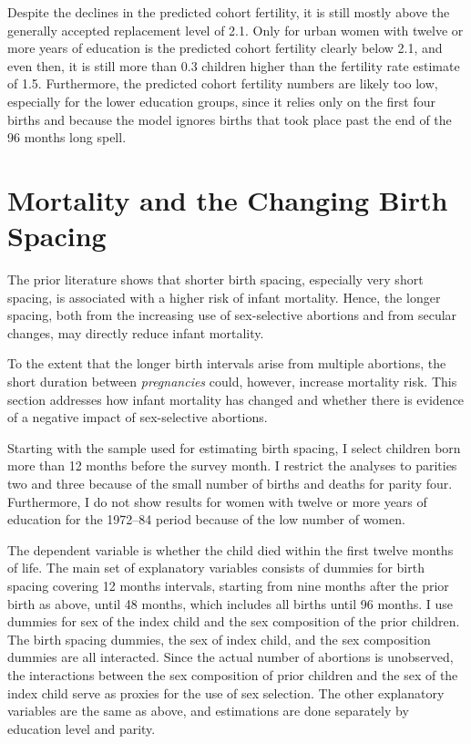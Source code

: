\documentclass[12pt,letterpaper]{article}
\begin{document}
%

Despite the declines in the predicted cohort fertility, it is still mostly above the 
generally accepted replacement level of 2.1.
Only for urban women with twelve or more years of education is the predicted cohort
fertility clearly below 2.1, and even then, it is still more than 0.3 children higher than 
the fertility rate estimate of 1.5.
Furthermore, the predicted cohort fertility numbers are likely too low,
especially for the lower education groups, since it relies only on the
first four births and because the model ignores births that took place past the end
of the 96 months long spell.


\section{Mortality and the Changing Birth Spacing\label{sec:mortality}}

The prior literature shows that shorter birth spacing, especially very short spacing,
is associated with a higher risk of infant mortality.
Hence, the longer spacing, both from the increasing use of sex-selective abortions and
from secular changes, may directly reduce infant mortality.

To the extent that the longer birth intervals arise from multiple abortions,
the short duration between \emph{pregnancies} could, however, increase mortality risk.
This section addresses how infant mortality has changed and whether there is evidence
of a negative impact of sex-selective abortions.

Starting with the sample used for estimating birth spacing, I select children born 
more than 12 months before the survey month.
I restrict the analyses to parities two and three because of the small number
of births and deaths for parity four.
Furthermore, I do not show results for women with twelve or more years of
education for the 1972--84 period because of the low number of women.

The dependent variable is whether the child died within the first twelve
months of life.
The main set of explanatory variables consists of dummies for birth spacing
covering 12 months intervals, starting from nine months after the prior birth 
as above, until 48 months, which includes all births until 96 months.
I use dummies for sex of the index child and the sex composition 
of the prior children.
The birth spacing dummies, the sex of index child, and the sex composition dummies
are all interacted.
Since the actual number of abortions is unobserved, the interactions between
the sex composition of prior children and the sex of the index child serve
as proxies for the use of sex selection.
The other explanatory variables are the same as above, and estimations
are done separately by education level and parity.
\end{document}
